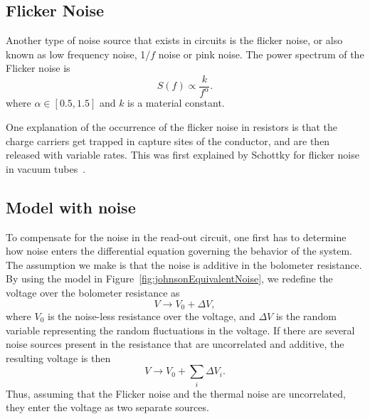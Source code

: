 \subsection{Flicker Noise}

Another type of noise source that exists in circuits is the flicker
noise, or also known as low frequency noise, 1/$f$ noise or pink noise. The power
spectrum of the Flicker noise is
\begin{equation}
  \label{eq:power_spectrum_flicker_noise}
  S(f) \propto \frac{k}{f^{\alpha}}.
\end{equation}
where $\alpha \in [0.5, 1.5]$ and $k$ is a material constant.

One explanation of the occurrence of the flicker noise in resistors is
that the charge carriers get trapped in capture sites of the
conductor, and are then released with variable rates. This was first
explained by Schottky for flicker noise in vacuum tubes~\cite{PhysRev.28.74}.


\subsection{Model with noise}

To compensate for the noise in the read-out circuit, one first has to
determine how noise enters the differential equation governing the
behavior of the system. The assumption we make is that the noise is
additive in the bolometer resistance. By using the model in
Figure~\ref{fig:johnsonEquivalentNoise}, we redefine the voltage over
the bolometer resistance as
\begin{equation}
  \label{eq:randomvariable_transformation}
  V \rightarrow V_0 + \Delta V,
\end{equation}
where $V_0$ is the noise-less resistance over the voltage, and $\Delta
V$ is the random variable representing the random fluctuations in the
voltage. If there are several noise sources present in the resistance
that are uncorrelated and additive, the resulting voltage is then
\begin{equation}
  \label{eq:randomvariable_transformation}
  V \rightarrow V_0 + \sum_i \Delta V_i.
\end{equation}
Thus, assuming that the Flicker noise and the thermal noise are
uncorrelated, they enter the voltage as two separate sources.


